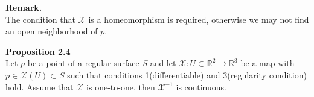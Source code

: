 \documentclass{article}
\begin{document}
\par
\textbf{Remark.}\\
The condition that $\mathcal{X}$ is a homeomorphism is required, otherwise we may not find an open neighborhood of $p$.

\par
\textbf{Proposition 2.4}\\
Let $p$ be a point of a regular surface $S$ and let $\mathcal{X}: U \subset \mathbb{R}^2 \to \mathbb{R}^3$ be a map with $p \in \mathcal{X}(U) \subset S$
such that conditions 1(differentiable) and 3(regularity condition) hold. Assume that $\mathcal{X}$ is one-to-one, then $\mathcal{X}^{-1}$ is continuous.
\end{document}
